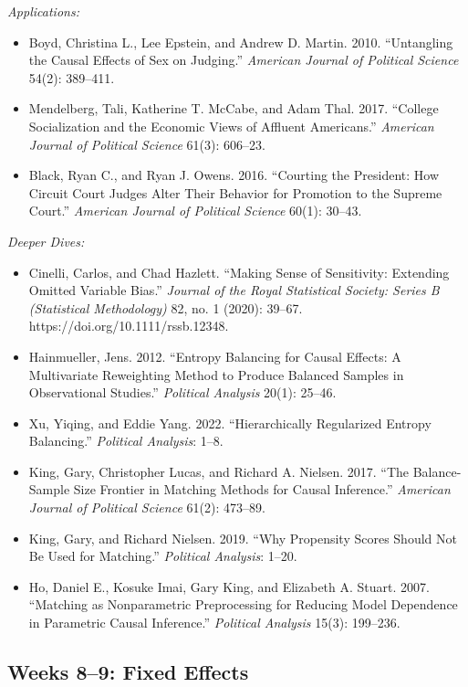 \documentclass[11pt, letterpaper]{article}
\begin{document}
\noindent \textit{Applications:}

\begin{itemize}
	\item Boyd, Christina L., Lee Epstein, and Andrew D. Martin. 2010. ``Untangling the Causal Effects of Sex on Judging.'' \textit{American Journal of Political Science} 54(2): 389–411.
	\item Mendelberg, Tali, Katherine T. McCabe, and Adam Thal. 2017. ``College Socialization and the Economic Views of Affluent Americans.'' \textit{American Journal of Political Science} 61(3): 606–23.
	\item Black, Ryan C., and Ryan J. Owens. 2016. “Courting the President: How Circuit Court Judges Alter Their Behavior for Promotion to the Supreme Court.” \textit{American Journal of Political Science} 60(1): 30–43.
\end{itemize}


\noindent \textit{Deeper Dives:}

\begin{itemize}
	\item Cinelli, Carlos, and Chad Hazlett. ``Making Sense of Sensitivity: Extending Omitted Variable Bias.'' \textit{Journal of the Royal Statistical Society: Series B (Statistical Methodology)} 82, no. 1 (2020): 39–67. https://doi.org/10.1111/rssb.12348.
	\item Hainmueller, Jens. 2012. ``Entropy Balancing for Causal Effects: A Multivariate Reweighting Method to Produce Balanced Samples in Observational Studies.'' \textit{Political Analysis} 20(1): 25–46.
	\item Xu, Yiqing, and Eddie Yang. 2022. ``Hierarchically Regularized Entropy Balancing.'' \textit{Political Analysis}: 1–8.
	\item King, Gary, Christopher Lucas, and Richard A. Nielsen. 2017. ``The Balance-Sample Size Frontier in Matching Methods for Causal Inference.'' \textit{American Journal of Political Science} 61(2): 473–89.
	\item King, Gary, and Richard Nielsen. 2019. ``Why Propensity Scores Should Not Be Used for Matching.'' \textit{Political Analysis}: 1–20.
	\item Ho, Daniel E., Kosuke Imai, Gary King, and Elizabeth A. Stuart. 2007. “Matching as Nonparametric Preprocessing for Reducing Model Dependence in Parametric Causal Inference.” \textit{Political Analysis} 15(3): 199–236.
\end{itemize}

\subsection*{Weeks 8--9: Fixed Effects}
\end{document}
